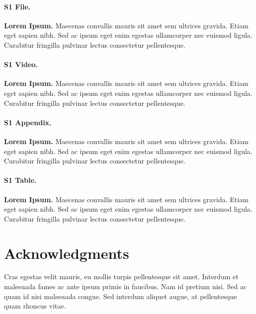 \documentclass[10pt,letterpaper]{article}
\begin{document}
\paragraph*{S1 File.}
\label{S1_File}
{\bf Lorem Ipsum.}  Maecenas convallis mauris sit amet sem ultrices gravida. Etiam eget sapien nibh. Sed ac ipsum eget enim egestas ullamcorper nec euismod ligula. Curabitur fringilla pulvinar lectus consectetur pellentesque.

\paragraph*{S1 Video.}
\label{S1_Video}
{\bf Lorem Ipsum.}  Maecenas convallis mauris sit amet sem ultrices gravida. Etiam eget sapien nibh. Sed ac ipsum eget enim egestas ullamcorper nec euismod ligula. Curabitur fringilla pulvinar lectus consectetur pellentesque.

\paragraph*{S1 Appendix.}
\label{S1_Appendix}
{\bf Lorem Ipsum.} Maecenas convallis mauris sit amet sem ultrices gravida. Etiam eget sapien nibh. Sed ac ipsum eget enim egestas ullamcorper nec euismod ligula. Curabitur fringilla pulvinar lectus consectetur pellentesque.

\paragraph*{S1 Table.}
\label{S1_Table}
{\bf Lorem Ipsum.} Maecenas convallis mauris sit amet sem ultrices gravida. Etiam eget sapien nibh. Sed ac ipsum eget enim egestas ullamcorper nec euismod ligula. Curabitur fringilla pulvinar lectus consectetur pellentesque.

\section*{Acknowledgments}
Cras egestas velit mauris, eu mollis turpis pellentesque sit amet. Interdum et malesuada fames ac ante ipsum primis in faucibus. Nam id pretium nisi. Sed ac quam id nisi malesuada congue. Sed interdum aliquet augue, at pellentesque quam rhoncus vitae.

\nolinenumbers
\end{document}

